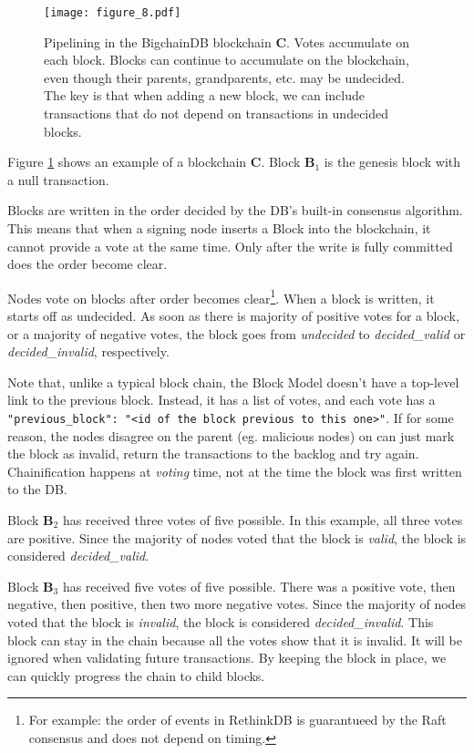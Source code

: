 \begin{figure}[!ht]
  \centering
  \texttt{[image: figure\_8.pdf]}
  \caption{Pipelining in the BigchainDB blockchain $\mathbf{C}$.
  Votes accumulate on each block.
  Blocks can continue to accumulate on the blockchain, even though their parents, grandparents, etc. may be undecided.
  The key is that when adding a new block, we can include transactions that do not depend on transactions in undecided blocks.}
  \label{fig:bigchaindb_chain_pipelining}
\end{figure}

Figure \ref{fig:bigchaindb_chain_pipelining} shows an example of a blockchain $\mathbf{C}$.
Block $\mathbf{B}_1$ is the genesis block with a null transaction.

Blocks are written in the order decided by the DB’s built-in consensus algorithm.
This means that when a signing node inserts a Block into the blockchain, it cannot provide a vote at the same time.
Only after the write is fully committed does the order become clear.

Nodes vote on blocks after order becomes clear\footnote{For example: the order of events in RethinkDB is guarantueed by the Raft consensus and does not depend on timing.}.
When a block is written, it starts off as undecided.
As soon as there is majority of positive votes for a block, or a majority of negative votes, the block goes from \textsf{\textit{undecided}} to \textsf{\textit{decided\_valid}} or \textsf{\textit{decided\_invalid}}, respectively.

Note that, unlike a typical block chain, the Block Model doesn't have a top-level link to the previous block.
Instead, it has a list of votes, and each vote has a \texttt{"previous\_block": "<id\ of\ the\ block\ previous\ to\ this\ one>"}.
If for some reason, the nodes disagree on the parent (eg. malicious nodes) on can just mark the block as invalid, return the transactions to the backlog and try again.
Chainification happens at \textit{voting} time, not at the time the block was first written to the DB.

Block $\mathbf{B}_2$ has received three votes of five possible.
In this example, all three votes are positive.
Since the majority of nodes voted that the block is \textsf{\textit{valid}}, the block is considered \textsf{\textit{decided\_valid}}.

Block $\mathbf{B}_3$ has received five votes of five possible.
There was a positive vote, then negative, then positive, then two more negative votes.
Since the majority of nodes voted that the block is \textsf{\textit{invalid}}, the block is considered \textsf{\textit{decided\_invalid}}.
This block can stay in the chain because all the votes show that it is invalid.
It will be ignored when validating future transactions.
By keeping the block in place, we can quickly progress the chain to child blocks.


